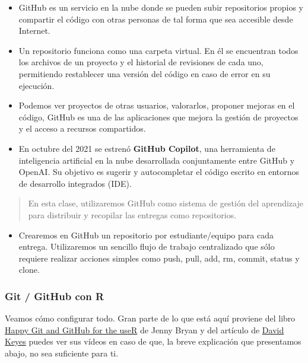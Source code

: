 \documentclass[
  letterpaper,
  DIV=11,
  numbers=noendperiod]{scrreprt}
\providecommand{\tightlist}{%
  \setlength{\itemsep}{0pt}\setlength{\parskip}{0pt}}\usepackage{longtable,booktabs,array}
\begin{document}
\begin{itemize}
\item
  GitHub es un servicio en la nube donde se pueden subir repositorios
  propios y compartir el código con otras personas de tal forma que sea
  accesible desde Internet.
\item
  Un repositorio funciona como una carpeta virtual. En él se encuentran
  todos los archivos de un proyecto y el historial de revisiones de cada
  uno, permitiendo restablecer una versión del código en caso de error
  en su ejecución.
\item
  Podemos ver proyectos de otras usuarios, valorarlos, proponer mejoras
  en el código, GitHub es una de las aplicaciones que mejora la gestión
  de proyectos y el acceso a recursos compartidos.
\item
  En octubre del 2021 se estrenó \textbf{GitHub Copilot}, una
  herramienta de inteligencia artificial en la nube desarrollada
  conjuntamente entre GitHub y OpenAI. Su objetivo es sugerir y
  autocompletar el código escrito en entornos de desarrollo integrados
  (IDE).
\end{itemize}

\begin{quote}
En esta clase, utilizaremos GitHub como sistema de gestión del
aprendizaje para distribuir y recopilar las entregas como repositorios.
\end{quote}

\begin{itemize}
\tightlist
\item
  Crearemos en GitHub un repositorio por estudiante/equipo para cada
  entrega. Utilizaremos un sencillo flujo de trabajo centralizado que
  sólo requiere realizar acciones simples como push, pull, add, rm,
  commit, status y clone.
\end{itemize}

\hypertarget{git-github-con-r}{%
\subsubsection{Git / GitHub con R}\label{git-github-con-r}}

Veamos cómo configurar todo. Gran parte de lo que está aquí proviene del
libro \href{https://happygitwithr.com/}{Happy Git and GitHub for the
useR} de Jenny Bryan y del artículo de
\href{https://rfortherestofus.com/2021/02/how-to-use-git-github-with-r/}{David
Keyes} puedes ver sus vídeos en caso de que, la breve explicación que
presentamos abajo, no sea suficiente para ti.
\end{document}

